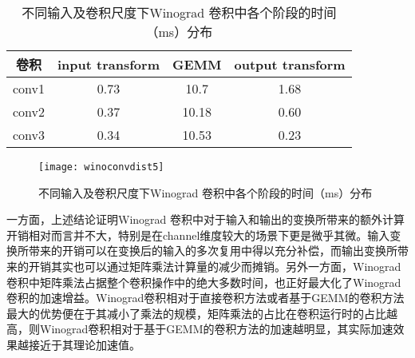 \begin{table}[]
\centering
\caption{不同输入及卷积尺度下Winograd 卷积中各个阶段的时间（ms）分布}
\begin{tabular}{cccc}
\toprule
卷积  & input transform           & GEMM                       & output transform \\
\midrule
conv1  & 0.73                      & 10.7                       & 1.68             \\
conv2  & 0.37                      & 10.18                      & 0.60             \\ 
conv3  & 0.34                      & 10.53                      & 0.23             \\
\bottomrule
\end{tabular}
\label{tbl:eff_dist}
\end{table}

\begin{figure}
\centering
\texttt{[image: winoconvdist5]}
\caption{不同输入及卷积尺度下Winograd 卷积中各个阶段的时间（ms）分布}
\label{fig:wino_conv_dist}
\end{figure}

一方面，上述结论证明Winograd 卷积中对于输入和输出的变换所带来的额外计算开销相对而言并不大，特别是在channel维度较大的场景下更是微乎其微。输入变换所带来的开销可以在变换后的输入的多次复用中得以充分补偿，而输出变换所带来的开销其实也可以通过矩阵乘法计算量的减少而摊销。另外一方面，Winograd卷积中矩阵乘法占据整个卷积操作中的绝大多数时间，也正好最大化了Winograd卷积的加速增益。Winograd卷积相对于直接卷积方法或者基于GEMM的卷积方法最大的优势便在于其减小了乘法的规模，矩阵乘法的占比在卷积运行时的占比越高，则Winograd卷积相对于基于GEMM的卷积方法的加速越明显，其实际加速效果越接近于其理论加速值。



